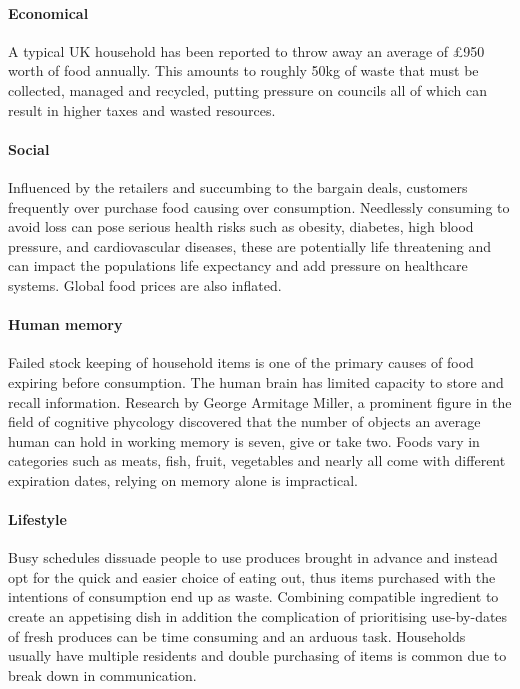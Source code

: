 \documentclass[a4paper, 11pt]{article}
\begin{document}
\paragraph{Economical}A typical UK household has been reported to throw away an average of \pounds950 worth of food annually. This amounts to roughly 50kg of waste that must be collected, managed and recycled, putting pressure on councils all of which can result in higher taxes and wasted resources.\cite{FoodWaste}

\paragraph{Social} Influenced by the retailers and succumbing to the bargain deals, customers frequently over purchase food causing over consumption. Needlessly consuming to avoid loss can pose serious health risks such as obesity, diabetes, high blood pressure, and cardiovascular diseases, these are potentially life threatening and can impact the populations life expectancy and add pressure on healthcare systems. Global food prices are also inflated.\cite{obesity}

\paragraph{Human memory}Failed stock keeping of household items is one of the primary causes of food expiring before consumption. The human brain has limited capacity to store and recall information. Research by George Armitage Miller, a prominent figure in the field of cognitive phycology discovered that the number of objects an average human can hold in working memory is seven, give or take two.\cite{memory} Foods vary in categories such as meats, fish, fruit, vegetables and nearly all come with different expiration dates, relying on memory alone is impractical. 

\paragraph{Lifestyle} Busy schedules dissuade people to use produces brought in advance and instead opt for the quick and easier choice of eating out, thus items purchased with the intentions of consumption end up as waste.\cite{motivation} Combining compatible ingredient to create an appetising dish in addition the complication of prioritising use-by-dates of fresh produces can be time consuming and an arduous task. Households usually have multiple residents and double purchasing of items is common due to break down in communication.
\end{document}
